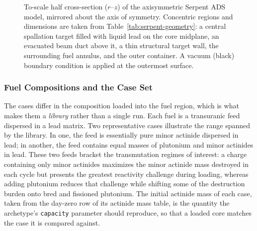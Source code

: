\begin{figure}[h!]
\begin{tikzpicture}[
    x=0.016cm, y=0.016cm,
    font=\footnotesize,
    region/.style={draw=black, line width=0.5pt},
    lead/.style={->, line width=0.4pt},
    lab/.style={align=center}
]
\end{tikzpicture}
\caption[Serpent \gls{ADS} core geometry.]{To-scale half cross-section
($r$--$z$) of the axisymmetric Serpent \gls{ADS} model, mirrored about the
axis of symmetry. Concentric regions and dimensions are taken from
Table~\ref{tab:serpent-geometry}: a central spallation target filled with
liquid lead on the core midplane, an evacuated beam duct above it, a thin structural target
wall, the surrounding fuel annulus, and the outer container. A vacuum (black)
boundary condition is applied at the outermost surface.}
\label{fig:serpent-geometry}
\end{figure}

\subsubsection{Fuel Compositions and the Case Set}
\label{subsubsec:serpent-materials}

The cases differ in the composition loaded into the fuel region, which is what
makes them a \emph{library} rather than a single run. Each fuel is a transuranic
feed dispersed in a lead matrix. Two representative cases illustrate the range
spanned by the library. In one, the feed is essentially pure minor actinide
dispersed in lead; in another, the feed contains equal masses of plutonium
and minor actinides in lead. These two feeds bracket the
transmutation regimes of interest: a charge containing only minor actinides
maximizes the
minor actinide mass destroyed in each cycle but presents the greatest
reactivity challenge during loading, whereas adding plutonium reduces that
challenge while shifting some of the
destruction burden onto bred and fissioned plutonium. The initial actinide mass
of each case, taken from the day-zero row of its actinide mass table, is the
quantity the archetype's \texttt{capacity} parameter should reproduce, so that a
loaded core matches the case it is compared against.

